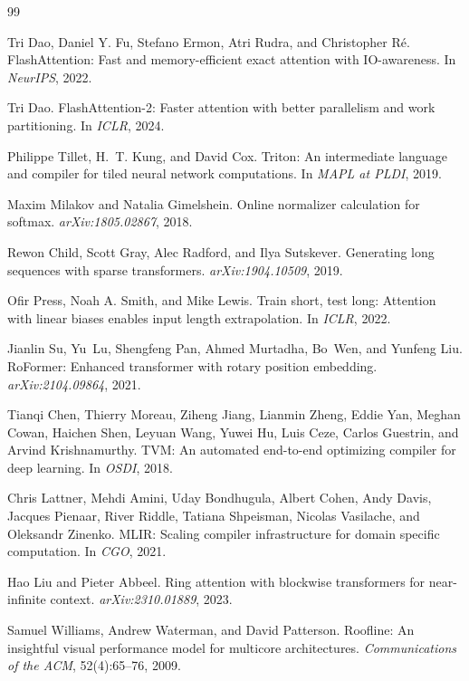 \documentclass[10pt,twocolumn]{article}
\begin{document}

\begin{thebibliography}{99}

Tri Dao, Daniel Y. Fu, Stefano Ermon, Atri Rudra, and Christopher R\'e.
\newblock FlashAttention: Fast and memory-efficient exact attention with IO-awareness.
\newblock In \textit{NeurIPS}, 2022.

Tri Dao.
\newblock FlashAttention-2: Faster attention with better parallelism and work partitioning.
\newblock In \textit{ICLR}, 2024.

Philippe Tillet, H.~T. Kung, and David Cox.
\newblock Triton: An intermediate language and compiler for tiled neural network computations.
\newblock In \textit{MAPL at PLDI}, 2019.

Maxim Milakov and Natalia Gimelshein.
\newblock Online normalizer calculation for softmax.
\newblock \textit{arXiv:1805.02867}, 2018.

Rewon Child, Scott Gray, Alec Radford, and Ilya Sutskever.
\newblock Generating long sequences with sparse transformers.
\newblock \textit{arXiv:1904.10509}, 2019.

Ofir Press, Noah A. Smith, and Mike Lewis.
\newblock Train short, test long: Attention with linear biases enables input length extrapolation.
\newblock In \textit{ICLR}, 2022.

Jianlin Su, Yu~Lu, Shengfeng Pan, Ahmed Murtadha, Bo~Wen, and Yunfeng Liu.
\newblock RoFormer: Enhanced transformer with rotary position embedding.
\newblock \textit{arXiv:2104.09864}, 2021.

Tianqi Chen, Thierry Moreau, Ziheng Jiang, Lianmin Zheng, Eddie Yan, Meghan Cowan,
Haichen Shen, Leyuan Wang, Yuwei Hu, Luis Ceze, Carlos Guestrin, and Arvind Krishnamurthy.
\newblock TVM: An automated end-to-end optimizing compiler for deep learning.
\newblock In \textit{OSDI}, 2018.

Chris Lattner, Mehdi Amini, Uday Bondhugula, Albert Cohen, Andy Davis,
Jacques Pienaar, River Riddle, Tatiana Shpeisman, Nicolas Vasilache, and Oleksandr Zinenko.
\newblock MLIR: Scaling compiler infrastructure for domain specific computation.
\newblock In \textit{CGO}, 2021.

Hao Liu and Pieter Abbeel.
\newblock Ring attention with blockwise transformers for near-infinite context.
\newblock \textit{arXiv:2310.01889}, 2023.

Samuel Williams, Andrew Waterman, and David Patterson.
\newblock Roofline: An insightful visual performance model for multicore architectures.
\newblock \textit{Communications of the ACM}, 52(4):65--76, 2009.

\end{thebibliography}
\end{document}
